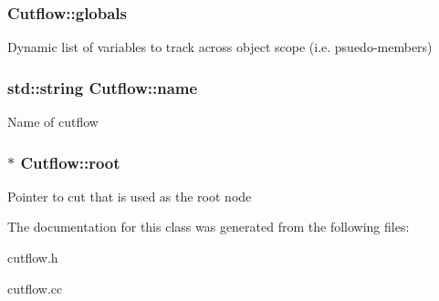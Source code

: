 \subsubsection[{\texorpdfstring{globals}{globals}}]{ Cutflow\+::globals}\hypertarget{classCutflow_a71390324488ac6ed4a72c41f4a2c1c10}{}\label{classCutflow_a71390324488ac6ed4a72c41f4a2c1c10}
Dynamic list of variables to track across object scope (i.\+e. psuedo-\/members) 
\subsubsection[{\texorpdfstring{name}{name}}]{\setlength{\rightskip}{0pt plus 5cm}std\+::string Cutflow\+::name}\hypertarget{classCutflow_a268e204c942ca35895a94f1be7ce111d}{}\label{classCutflow_a268e204c942ca35895a94f1be7ce111d}
Name of cutflow 
\subsubsection[{\texorpdfstring{root}{root}}]{$\ast$ Cutflow\+::root\hspace{0.3cm}{\ttfamily [protected]}}\hypertarget{classCutflow_a96f2343bfae77c94f2e87b5f3a128d6d}{}\label{classCutflow_a96f2343bfae77c94f2e87b5f3a128d6d}
Pointer to cut that is used as the root node 

The documentation for this class was generated from the following files\+:\begin{DoxyCompactItemize}
\item 
cutflow.\+h\item 
cutflow.\+cc\end{DoxyCompactItemize}
